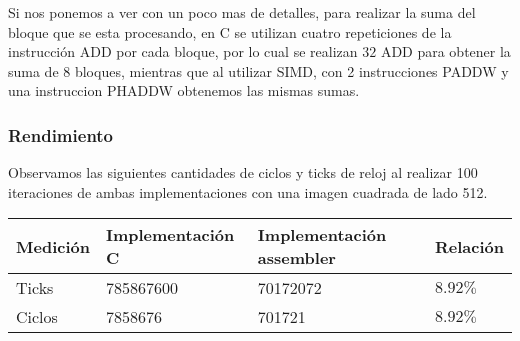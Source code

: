 Si nos ponemos a ver con un poco mas de detalles, para realizar la suma del bloque que se esta procesando, en C se utilizan cuatro repeticiones de la instrucción ADD por cada bloque, por lo cual se realizan $32$ ADD para obtener la suma de 8 bloques, mientras que al utilizar SIMD, con 2 instrucciones PADDW y una instruccion PHADDW obtenemos las mismas sumas.

\subsubsection{Rendimiento}

Observamos las siguientes cantidades de ciclos y ticks de reloj al realizar 100 iteraciones de ambas implementaciones con una imagen cuadrada de lado 512.

\begin{center}
    \begin{tabular}{|l|l|l|l|}
        \hline
        Medición & Implementación C & Implementación assembler & Relación \\
        \hline
        Ticks    & 785867600      & 70172072               & $8.92\%$ \\
        Ciclos   & 7858676        & 701721                 & $8.92\%$ \\
        \hline
    \end{tabular}
\end{center}